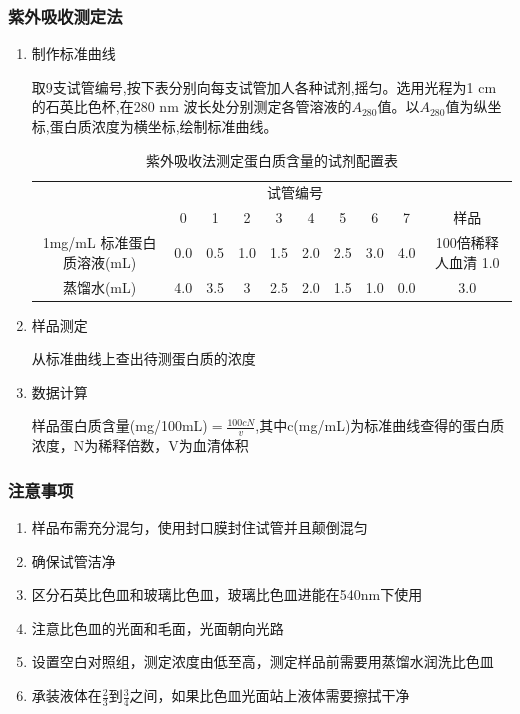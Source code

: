 \documentclass[UTF8]{ctexart}
\begin{document}
\subsubsection{紫外吸收测定法}
\begin{enumerate}
    \item 制作标准曲线

    取9支试管编号,按下表分别向每支试管加人各种试剂,摇匀。选用光程为1 cm 的石英比色杯,在280 nm 波长处分别测定各管溶液的$A_{280}$值。以$A_{280}$值为纵坐标,蛋白质浓度为横坐标,绘制标准曲线。
    \begin{table}[H]
        \centering
        \caption{紫外吸收法测定蛋白质含量的试剂配置表}
        \begin{tabular}{cccccccccc}
        \toprule
        & \multicolumn{8}{c}{试管编号} \\
        \cmidrule{2-9} 
        & 0 & 1 & 2 & 3 & 4 & 5 & 6 & 7 & 样品 \\
        \midrule
        1mg/mL 标准蛋白质溶液(mL) & 0.0 & 0.5 & 1.0 & 1.5 & 2.0 & 2.5 & 3.0 & 4.0 & 100倍稀释人血清 1.0 \\
        蒸馏水(mL) & 4.0 & 3.5 & 3 & 2.5 & 2.0 & 1.5 & 1.0 & 0.0 & 3.0 \\
        \bottomrule
        \end{tabular}
    \end{table}
    
    \item 样品测定

    从标准曲线上查出待测蛋白质的浓度

    \item 数据计算
    
    样品蛋白质含量(mg/100mL)$=\frac{100cN}{v}$,其中c(mg/mL)为标准曲线查得的蛋白质浓度，N为稀释倍数，V为血清体积
\end{enumerate}

\subsubsection{注意事项}
\begin{enumerate}
    \item 样品布需充分混匀，使用封口膜封住试管并且颠倒混匀
    \item 确保试管洁净
    \item 区分石英比色皿和玻璃比色皿，玻璃比色皿进能在540nm下使用
    \item 注意比色皿的光面和毛面，光面朝向光路
    \item 设置空白对照组，测定浓度由低至高，测定样品前需要用蒸馏水润洗比色皿
    \item 承装液体在$\frac{2}{3}$到$\frac{3}{4}$之间，如果比色皿光面站上液体需要擦拭干净
\end{enumerate}
\vfill
\end{document}
